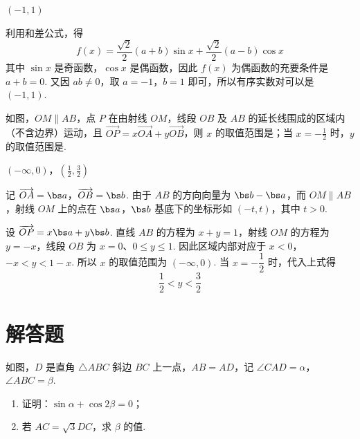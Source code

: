 \begin{answer}
\((-1,1)\)
\end{answer}

\begin{solution}
利用和差公式，得
\[
f(x)=\frac{\sqrt2}{2}(a+b)\sin x+\frac{\sqrt2}{2}(a-b)\cos x
\]
其中 \(\sin x\) 是奇函数，\(\cos x\) 是偶函数，因此 \(f(x)\) 为偶函数的充要条件是 \(a+b=0\). 又因 \(ab\ne0\)，取 \(a=-1\)，\(b=1\) 即可，所以有序实数对可以是 \((-1,1)\).
\end{solution}

\begin{problem}
如图，\(OM \parallel AB\)，点 \(P\) 在由射线 \(OM\)，线段 \(OB\) 及 \(AB\) 的延长线围成的区域内（不含边界）运动，且 \(\overrightarrow{OP} = x\overrightarrow{OA} + y\overrightarrow{OB}\)，则 \(x\) 的取值范围是\fillinblank{}；当 \(x = -\frac{1}{2}\) 时，\(y\) 的取值范围是\fillinblank{}.

\end{problem}

\begin{answer}
\((-\infty,0)\)，\(\left(\frac{1}{2},\frac{3}{2}\right)\)
\end{answer}

\begin{solution}
记 \(\overrightarrow{OA}=\bs a\)，\(\overrightarrow{OB}=\bs b\). 由于 \(AB\) 的方向向量为 \(\bs b-\bs a\)，而 \(OM\parallel AB\)，射线 \(OM\) 上的点在 \(\bs a\)，\(\bs b\) 基底下的坐标形如 \((-t,t)\)，其中 \(t>0\).

设 \(\overrightarrow{OP}=x\bs a+y\bs b\). 直线 \(AB\) 的方程为 \(x+y=1\)，射线 \(OM\) 的方程为 \(y=-x\)，线段 \(OB\) 为 \(x=0\)、\(0\leqslant y\leqslant1\). 因此区域内部对应于
\(x<0\)，\(-x<y<1-x\).
所以 \(x\) 的取值范围为 \((-\infty,0)\). 当 \(x=-\dfrac12\) 时，代入上式得
\[
\frac12<y<\frac32
\]
\end{solution}

\section{解答题}
\begin{problem}
如图，\(D\) 是直角 \(\triangle ABC\) 斜边 \(BC\) 上一点，\(AB = AD\)，记 \(\angle CAD = \alpha\)，\(\angle ABC = \beta\).

\begin{enumerate}
\item 证明：\(\sin \alpha + \cos 2\beta = 0\)；
\item 若 \(AC = \sqrt{3}DC\)，求 \(\beta\) 的值.
\end{enumerate}

\end{problem}


